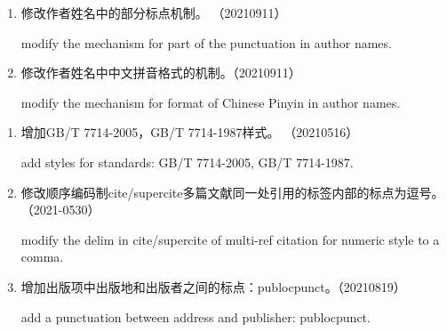 

\label{up:latest}


\label{up:20210911}

\begin{enumerate}
\item 修改作者姓名中的部分标点机制。 （20210911）

modify the mechanism for part of the punctuation in author names.

\item 修改作者姓名中中文拼音格式的机制。（20210911）

modify the mechanism for format of Chinese Pinyin in author names.

\end{enumerate}



\label{up:20210819}

\begin{enumerate}
\item 增加GB/T 7714-2005，GB/T 7714-1987样式。 （20210516）

add styles for standards: GB/T 7714-2005, GB/T 7714-1987.

\item 修改顺序编码制cite/supercite多篇文献同一处引用的标签内部的标点为逗号。（2021-0530）

modify the delim in cite/supercite of multi-ref citation for numeric style to a comma.

\item 增加出版项中出版地和出版者之间的标点：publocpunct。（20210819）

add a punctuation between address and publisher: publocpunct.


\end{enumerate}


\label{up:20210506}

